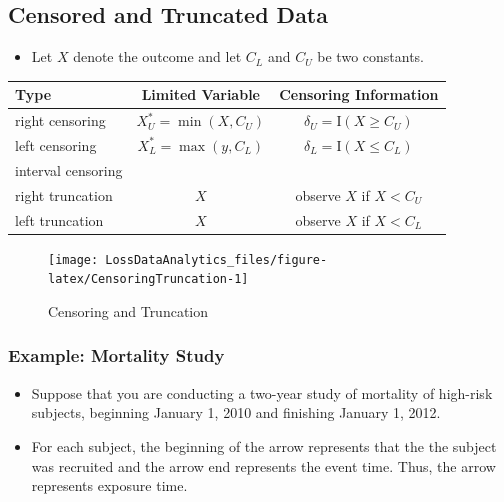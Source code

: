 \documentclass[]{book}
\providecommand{\tightlist}{%
  \setlength{\itemsep}{0pt}\setlength{\parskip}{0pt}}
\begin{document}
\subsection{Censored and Truncated
Data}\label{censored-and-truncated-data}

\begin{itemize}
\tightlist
\item
  Let \(X\) denote the outcome and let \(C_L\) and \(C_U\) be two
  constants.
\end{itemize}

\begin{longtable}[]{@{}lcc@{}}
\toprule
Type & Limited Variable & Censoring Information\tabularnewline
\midrule
\endhead
right censoring & \(X_U^{\ast}= \min(X, C_U)\) &
\(\delta_U= \mathrm{I}(X \geq C_U)\)\tabularnewline
left censoring & \(X_L^{\ast}= \max(y, C_L)\) &
\(\delta_L= \mathrm{I}(X \leq C_L)\)\tabularnewline
\begin{minipage}[t]{0.32\columnwidth}\raggedright\strut
interval censoring\strut
\end{minipage} & \begin{minipage}[t]{0.32\columnwidth}\centering\strut
\strut
\end{minipage} & \begin{minipage}[t]{0.32\columnwidth}\centering\strut
\strut
\end{minipage}\tabularnewline
right truncation & \(X\) & observe \(X\) if \(X < C_U\)\tabularnewline
left truncation & \(X\) & observe \(X\) if \(X < C_L\)\tabularnewline
\bottomrule
\end{longtable}

\begin{figure}

{\centering \texttt{[image: LossDataAnalytics\_files/figure-latex/CensoringTruncation-1]} 

}

\caption{Censoring and Truncation}\label{fig:CensoringTruncation}
\end{figure}

\subsubsection{Example: Mortality Study}\label{example-mortality-study}

\begin{itemize}
\item
  Suppose that you are conducting a two-year study of mortality of
  high-risk subjects, beginning January 1, 2010 and finishing January 1,
  2012.
\item
  For each subject, the beginning of the arrow represents that the the
  subject was recruited and the arrow end represents the event time.
  Thus, the arrow represents exposure time.
\end{itemize}
\end{document}
